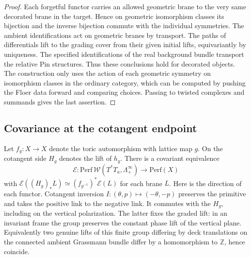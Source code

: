 \begin{proof}
Each forgetful functor carries an allowed geometric brane to the very same decorated brane in the target. Hence on geometric isomorphism classes its bijection and the inverse bijection commute with the individual symmetries. The ambient identifications act on geometric branes by transport. The paths of differentials lift to the grading cover from their given initial lifts, equivariantly by uniqueness. The specified identifications of the real background bundle transport the relative Pin structures. Thus these conclusions hold for decorated objects. The construction only uses the action of each geometric symmetry on isomorphism classes in the ordinary category, which can be computed by pushing the Floer data forward and comparing choices. Passing to twisted complexes and summands gives the last assertion.
\end{proof}

\subsection{Covariance at the cotangent endpoint}
Let $f_g:X\to X$ denote the toric automorphism with lattice map $g$. On the cotangent side $H_g$ denotes the lift of $h_g$. There is a covariant equivalence
\begin{equation}\label{eq:coherentendpoint}
  \mathcal E:\mathrm{Perf}\,\mathcal W(T^*T_a,\Lambda_+^\infty)
                          \longrightarrow \mathrm{Perf}(X)
\end{equation}
with $\mathcal E((H_g)_*L)\simeq(f_{g^{-1}})^*\mathcal E(L)$ for each brane $L$. Here is the direction of each functor. Cotangent inversion $I:(\theta,p)\mapsto(-\theta,-p)$ preserves the primitive and takes the positive link to the negative link. It commutes with the $H_g$, including on the vertical polarization. The latter fixes the graded lift: in an invariant frame the group preserves the constant phase lift of the vertical plane. Equivalently two genuine lifts of this finite group differing by deck translations on the connected ambient Grassmann bundle differ by a homomorphism to $\mathbb Z$, hence coincide.

